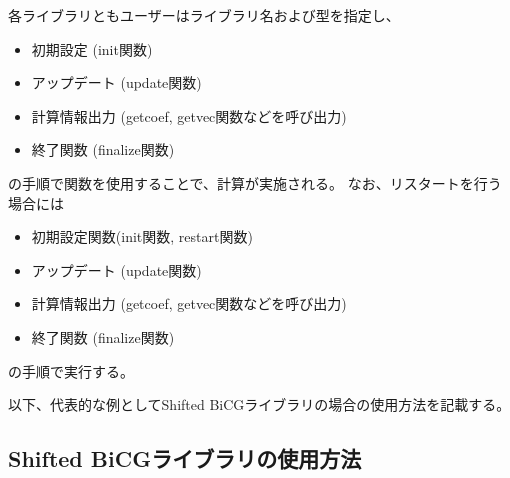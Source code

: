 \documentclass[12pt,titlepage]{jarticle}
\begin{document}
各ライブラリともユーザーはライブラリ名および型を指定し、
\begin{itemize}
\item 初期設定 (init関数)
\item アップデート (update関数)
\item 計算情報出力 (getcoef, getvec関数などを呼び出力)
\item 終了関数 (finalize関数)
\end{itemize}
の手順で関数を使用することで、計算が実施される。
なお、リスタートを行う場合には
\begin{itemize}
\item 初期設定関数(init関数, restart関数)
\item アップデート (update関数)
\item 計算情報出力 (getcoef, getvec関数などを呼び出力)
\item 終了関数 (finalize関数)
\end{itemize}
の手順で実行する。
 
以下、代表的な例としてShifted BiCGライブラリの場合の使用方法を記載する。

\subsection{Shifted BiCGライブラリの使用方法}
\end{document}
